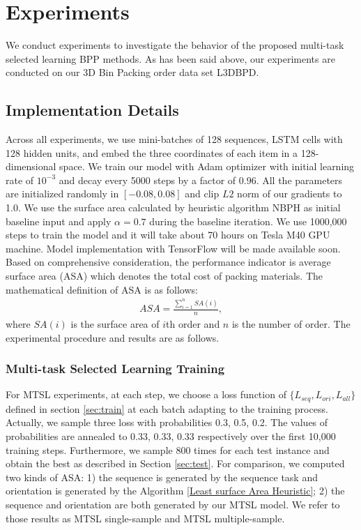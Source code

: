\section{Experiments}
\label{sec:exp}
We conduct experiments to investigate the behavior of the proposed multi-task selected learning BPP methods. As has been said above, our experiments are conducted on our 3D Bin Packing order data set L3DBPD.


\subsection{Implementation Details}
\label{sec:implementation}
Across all experiments, we use mini-batches of 128 sequences, LSTM cells with 128 hidden units, and embed the three coordinates of each item in a 128-dimensional space. We train our model with Adam optimizer \cite{kingma2014adam} with initial learning rate of $10^{-3}$ and decay every 5000 steps by a factor of 0.96. All the parameters are initialized randomly in $[-0.08,0.08]$ and clip $L2$ norm of our gradients to 1.0. We use the surface area calculated by heuristic algorithm NBPH as initial baseline input and apply $\alpha=0.7$ during the baseline iteration. We use 1000,000 steps to train the model and it will take about 70 hours on Tesla M40 GPU machine. Model implementation with TensorFlow will be made available soon.
Based on comprehensive consideration, the performance indicator is average surface area (ASA) which denotes the total cost of packing materials. The mathematical definition of ASA is as follows:
\begin{eqnarray*}
	ASA = \frac{\sum_{i=1}^{n} SA(i)}{n},
\end{eqnarray*}
where $SA(i)$ is the surface area of $i$th order and $n$ is the number of order.
The experimental procedure and results are as follows.

\subsubsection{Multi-task Selected Learning Training}
For MTSL experiments, at each step, we choose a loss function of $\{L_{seq}, L_{ori}, L_{all}\}$ defined in section \ref{sec:train} at each batch adapting to the training process. Actually, we sample three loss with probabilities 0.3, 0.5, 0.2. The values of probabilities are annealed to 0.33, 0.33, 0.33 respectively over the first 10,000 training steps. Furthermore, we sample 800 times for each test instance and obtain the best as described in Section \ref{sec:test}. For comparison, we computed two kinds of ASA: 1) the sequence is generated by the sequence task and orientation is generated by the Algorithm \ref{Least surface Area Heuristic}; 2) the sequence and orientation are both generated by our MTSL model. We refer to those results as MTSL single-sample and MTSL multiple-sample.

